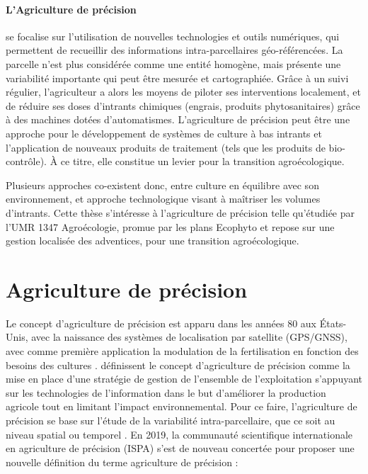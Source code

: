 \documentclass[../thesis.tex]{subfiles}
\begin{document}
    \paragraph{L'Agriculture de précision} se focalise sur l'utilisation de nouvelles technologies et outils numériques, qui permettent de recueillir des informations intra-parcellaires géo-référencées. La parcelle n'est plus considérée comme une entité homogène, mais présente une variabilité importante qui peut être mesurée et cartographiée. Grâce à un suivi régulier, l'agriculteur a alors les moyens de piloter ses interventions localement, et de réduire ses doses d'intrants chimiques (engrais, produits phytosanitaires) grâce à des machines dotées d'automatismes. L'agriculture de précision peut être une approche pour le développement de systèmes de culture à bas intrants et l'application de nouveaux produits de traitement (tels que les produits de bio-contrôle). À ce titre, elle constitue un levier pour la transition agroécologique.
    
    Plusieurs approches co-existent donc, entre culture en équilibre avec son environnement, et approche technologique visant à maîtriser les volumes d'intrants. Cette thèse s'intéresse à l'agriculture de précision telle qu'étudiée par l'UMR 1347 Agroécologie, promue par les plans Ecophyto et repose sur une gestion localisée des adventices, pour une transition agroécologique.
    
    \newpage
    
    \section{Agriculture de précision}
    \label{sec:precise-agriculture}
    
    Le concept d'agriculture de précision est apparu dans les années 80 aux États-Unis, avec la naissance des systèmes de localisation par satellite (GPS/GNSS), avec comme première application la modulation de la fertilisation en fonction des besoins des cultures \cite{robert2002precision}. \cite{mcbratney2005future, taylor2005general} définissent le concept d'agriculture de précision comme la mise en place d'une stratégie de gestion de l'ensemble de l'exploitation s'appuyant sur les technologies de l'information dans le but d'améliorer la production agricole tout en limitant l'impact environnemental. Pour ce faire, l'agriculture de précision se base sur l'étude de la variabilité intra-parcellaire, que ce soit au niveau spatial ou temporel \cite{pierce1999aspects}. En 2019, la communauté scientifique internationale  en agriculture de précision (ISPA) s'est de nouveau concertée pour proposer une nouvelle définition du terme agriculture de précision :
    
\end{document}
